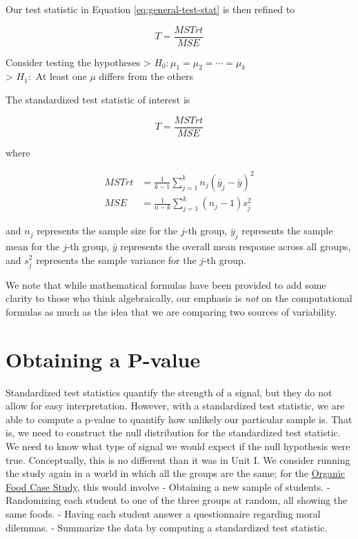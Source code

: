 \documentclass[]{book}
\theoremstyle{definition}
\theoremstyle{definition}
\theoremstyle{remark}
\let\BeginKnitrBlock\begin \let\EndKnitrBlock\end
\begin{document}
Our test statistic in Equation \eqref{eq:general-test-stat} is then
refined to

\begin{equation}
  T = \frac{MSTrt}{MSE}
  \label{eq:anova-test-stat}
\end{equation}

\BeginKnitrBlock{rmdtip}
Consider testing the hypotheses \textgreater{}
\(H_0: \mu_1 = \mu_2 = \dotsb = \mu_k\)\\
\textgreater{} \(H_1:\) At least one \(\mu\) differs from the others

The standardized test statistic of interest is

\[
  T = \frac{MSTrt}{MSE}
\]

where

\[
\begin{aligned}
  MSTrt &= \frac{1}{k-1} \sum_{j=1}^{k} n_j \left(\bar{y}_j - \bar{y}\right)^2 \\
  MSE &= \frac{1}{n-k} \sum_{j=1}^{k} \left(n_j - 1\right) s_j^2
\end{aligned}
\]

and \(n_j\) represents the sample size for the \(j\)-th group,
\(\bar{y}_j\) represents the sample mean for the \(j\)-th group,
\(\bar{y}\) represents the overall mean response across all groups, and
\(s_j^2\) represents the sample variance for the \(j\)-th group.
\EndKnitrBlock{rmdtip}

We note that while mathematical formulas have been provided to add some
clarity to those who think algebraically, our emphasis is \emph{not} on
the computational formulas as much as the idea that we are comparing two
sources of variability.

\section{Obtaining a P-value}\label{obtaining-a-p-value}

Standardized test statistics quantify the strength of a signal, but they
do not allow for easy interpretation. However, with a standardized test
statistic, we are able to compute a p-value to quantify how unlikely our
particular sample is. That is, we need to construct the null
distribution for the standardized test statistic. We need to know what
type of signal we would expect if the null hypothesis were true.
Conceptually, this is no different than it was in Unit I. We consider
running the study again in a world in which all the groups are the same;
for the \protect\hyperlink{CaseOrganic}{Organic Food Case Study}, this
would involve - Obtaining a new sample of students. - Randomizing each
student to one of the three groups at random, all showing the same
foods. - Having each student answer a questionnaire regarding moral
dilemmas. - Summarize the data by computing a standardized test
statistic.
\end{document}
